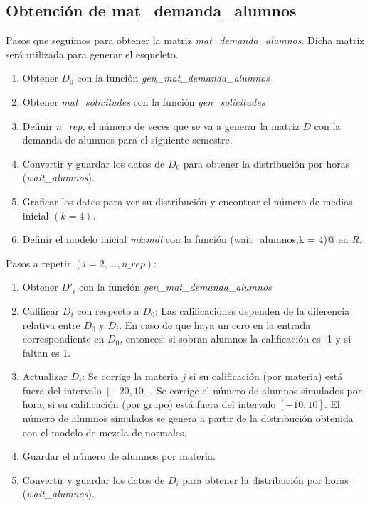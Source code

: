 \subsection{Obtención de mat\_demanda\_alumnos} \label{GMM_D}

Pasos que seguimos para obtener la matriz \textit{mat\_demanda\_alumnos}. Dicha matriz será utilizada para generar el esqueleto.

\begin{enumerate}
\item Obtener $D_{0}$ con la función \textit{gen\_mat\_demanda\_alumnos}

\item Obtener \textit{mat\_solicitudes} con la función \textit{gen\_solicitudes}

\item Definir \textit{n\_rep}, el número de veces que se va a generar la matriz $D$ con la demanda de alumnos para el siguiente semestre.

\item Convertir y guardar los datos de $D_{0}$ para obtener la distribución por horas (\textit{wait\_alumnos}).

\item Graficar los datos para ver su distribución y encontrar el número de medias inicial $(k = 4)$.

\item Definir el modelo inicial \textit{mixmdl} con la función \verb@normalmixEM(wait_alumnos,k = 4)@ en \textit{R}.
\end{enumerate}

Pasos a repetir $(i = 2, \ldots, \textit{n\_rep})$:

\begin{enumerate}
\item Obtener $D'_{i}$ con la función \textit{gen\_mat\_demanda\_alumnos}

\item Calificar $D_{i}$ con respecto a $D_{0}$: Las calificaciones dependen de la diferencia relativa entre $D_{0}$ y $D_{i}$. En caso de que haya un cero en la entrada correspondiente en $D_{0}$, entonces: si sobran alumnos la calificación es -1 y si faltan es 1.

\item Actualizar $D_{i}$: Se corrige la materia $j$ si su calificación (por materia) está fuera del intervalo $[-20,10]$. Se corrige el número de alumnos simulados por hora, si su calificación (por grupo) está fuera del intervalo $[-10,10]$. El número de alumnos simulados se genera a partir de la distribución obtenida con el modelo de mezcla de normales.

\item Guardar el número de alumnos por materia.

\item Convertir y guardar los datos de $D_{i}$ para obtener la distribución por horas (\textit{wait\_alumnos}).
\end{enumerate}

